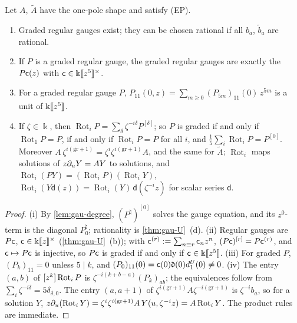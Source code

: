 \begin{prop}
\label{prop:gau-graded}
Let $A$, $\tilde A$ have the one-pole shape and satisfy (EP).
\begin{enumerate}
\item Graded regular gauges exist; they can be chosen rational if all $b_a$, $\tilde b_a$ are rational.
\item If $P$ is a graded regular gauge, the graded regular gauges are exactly the $P\mathsf{c}(z)$ with $\mathsf{c}\in\Bbbk[\![ z^5 ]\!]^\times$.
\item For a graded regular gauge $P$, $P_{11}(0,z)=\sum_{m\geq0}(P_{5m})_{11}(0)\,z^{5m}$ is a unit of $\Bbbk[\![ z^5 ]\!]$.
\item If $\zeta\in\Bbbk$, then $\operatorname{Rot}_iP=\sum_\delta\zeta^{-i\delta}P^{[\delta]}$; so $P$ is graded if and only if $\operatorname{Rot}_1P=P$, if and only if $\operatorname{Rot}_iP=P$ for all $i$, and $\frac15\sum_i\operatorname{Rot}_iP=P^{[0]}$. Moreover $A\,\zeta^{i(\mathrm{gr}+1)}=\zeta^i\zeta^{i(\mathrm{gr}+1)}A$, and the same for $\tilde A$; $\operatorname{Rot}_i$ maps solutions of $z\partial_uY=AY$ to solutions, and $\operatorname{Rot}_i(PY)=(\operatorname{Rot}_iP)(\operatorname{Rot}_iY)$, $\operatorname{Rot}_i(Y\mathsf d(z))=\operatorname{Rot}_i(Y)\,\mathsf d(\zeta^{-i}z)$ for scalar series $\mathsf d$.
\end{enumerate}
\end{prop}

\begin{proof}
(i) By \cref{lem:gau-degree}, $(P^\natural)^{[0]}$ solves the gauge equation, and its $z^0$-term is the diagonal $P^\natural_0$; rationality is \cref{thm:gau-U}~(d). (ii) Regular gauges are $P\mathsf{c}$, $\mathsf{c}\in\Bbbk[\![ z ]\!]^\times$ (\cref{thm:gau-U}~(b)); with $\mathsf{c}^{(r)}:=\sum_{n\equiv r}\mathsf{c}_nz^n$, $(P\mathsf{c})^{[r]}=P\mathsf{c}^{(r)}$, and $\mathsf{c}\mapsto P\mathsf{c}$ is injective, so $P\mathsf{c}$ is graded if and only if $\mathsf{c}\in\Bbbk[\![ z^5 ]\!]$. (iii) For graded $P$, $(P_k)_{11}=0$ unless $5\mid k$, and $(P_0)_{11}(0)=\mathsf{c}(0)\mathfrak d(0)d^U_1(0)\neq0$. (iv) The entry $(a,b)$ of $[z^k]\operatorname{Rot}_iP$ is $\zeta^{-i(k+b-a)}(P_k)_{ab}$; the equivalences follow from $\sum_i\zeta^{-i\delta}=5\delta_{\delta,0}$. The entry $(a,a+1)$ of $\zeta^{i(\mathrm{gr}+1)}A\zeta^{-i(\mathrm{gr}+1)}$ is $\zeta^{-i}b_a$, so for a solution $Y$, $z\partial_u(\operatorname{Rot}_iY)=\zeta^i\zeta^{i(\mathrm{gr}+1)}A\,Y(u,\zeta^{-i}z)=A\operatorname{Rot}_iY$. The product rules are immediate.
\end{proof}



